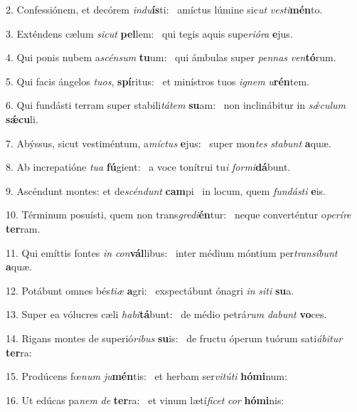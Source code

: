 2. Confessiónem, et decórem \textit{ind}\textit{u}\textbf{ís}ti: \ast\  amíctus lúmine sic\textit{ut} \textit{ves}\textit{ti}\textbf{mén}to.\

3. Exténdens cælum \textit{sic}\textit{ut} \textbf{pel}lem: \ast\  qui tegis aquis supe\textit{ri}\textit{ó}\textit{ra} \textbf{e}jus.\

4. Qui ponis nubem a\textit{scén}\textit{sum} \textbf{tu}um: \ast\  qui ámbulas super \textit{pen}\textit{nas} \textit{ven}\textbf{tó}rum.\

5. Qui facis ángelos \textit{tu}\textit{os}, \textbf{spí}ritus: \ast\  et minístros tuos \textit{i}\textit{gnem} \textit{u}\textbf{rén}tem.\

6. Qui fundásti terram super stabili\textit{tá}\textit{tem} \textbf{su}am: \ast\  non inclinábitur in \textit{sǽ}\textit{cu}\textit{lum} \textbf{sǽ}\textbf{cu}li.\

7. Abýssus, sicut vestiméntum, a\textit{míc}\textit{tus} \textbf{e}jus: \ast\  super mon\textit{tes} \textit{sta}\textit{bunt} \textbf{a}quæ.\

8. Ab increpatióne \textit{tu}\textit{a} \textbf{fú}gient: \ast\  a voce tonítrui tu\textit{i} \textit{for}\textit{mi}\textbf{dá}bunt.\

9. Ascéndunt montes: et de\textit{scén}\textit{dunt} \textbf{cam}pi \ast\  in locum, quem \textit{fun}\textit{dás}\textit{ti} \textbf{e}is.\

10. Términum posuísti, quem non trans\textit{gre}\textit{di}\textbf{én}tur: \ast\  neque converténtur o\textit{pe}\textit{rí}\textit{re} \textbf{ter}ram.\

11. Qui emíttis fontes \textit{in} \textit{con}\textbf{vál}libus: \ast\  inter médium móntium per\textit{trans}\textit{í}\textit{bunt} \textbf{a}quæ.\

12. Potábunt omnes bés\textit{ti}\textit{æ} \textbf{a}gri: \ast\  exspectábunt ónagri \textit{in} \textit{si}\textit{ti} \textbf{su}a.\

13. Super ea vólucres cæli \textit{ha}\textit{bi}\textbf{tá}bunt: \ast\  de médio petrá\textit{rum} \textit{da}\textit{bunt} \textbf{vo}ces.\

14. Rigans montes de superió\textit{ri}\textit{bus} \textbf{su}is: \ast\  de fructu óperum tuórum sati\textit{á}\textit{bi}\textit{tur} \textbf{ter}ra:\

15. Prodúcens fœ\textit{num} \textit{ju}\textbf{mén}tis: \ast\  et herbam ser\textit{vi}\textit{tú}\textit{ti} \textbf{hó}\textbf{mi}num:\

16. Ut edúcas pa\textit{nem} \textit{de} \textbf{ter}ra: \ast\  et vinum lætí\textit{fi}\textit{cet} \textit{cor} \textbf{hó}\textbf{mi}nis:\

